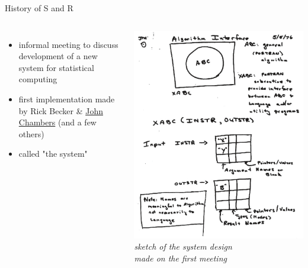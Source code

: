 \documentclass[t,12pt]{beamer}
\begin{document}
\begin{frame}{History of S and R}

\begin{columns}


\begin{itemize}
   \item informal meeting to discuss development of a new system for statistical computing
   \item first implementation made by Rick Becker \& \href{http://en.wikipedia.org/wiki/John_Chambers_(programmer)}{John Chambers} (and a few others)
   \item called "the system"
\end{itemize}


\begin{center}
\includegraphics[width=\textwidth]{sketch.png} \\
\tiny
\textit{sketch of the system design \\ made on the first meeting}
\end{center}

\end{columns}

\end{frame}
\end{document}
